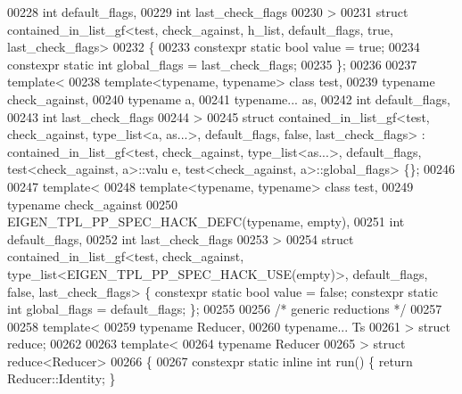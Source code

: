 \begin{DoxyCode}
00228   \textcolor{keywordtype}{int} default\_flags,
00229   \textcolor{keywordtype}{int} last\_check\_flags
00230 >
00231 \textcolor{keyword}{struct }contained\_in\_list\_gf<test, check\_against, h\_list, default\_flags, true, last\_check\_flags>
00232 \{
00233   constexpr \textcolor{keyword}{static} \textcolor{keywordtype}{bool} value = \textcolor{keyword}{true};
00234   constexpr \textcolor{keyword}{static} \textcolor{keywordtype}{int} global\_flags = last\_check\_flags;
00235 \};
00236 
00237 \textcolor{keyword}{template}<
00238   \textcolor{keyword}{template}<\textcolor{keyword}{typename}, \textcolor{keyword}{typename}> \textcolor{keyword}{class }test,
00239   \textcolor{keyword}{typename} check\_against,
00240   \textcolor{keyword}{typename} a,
00241   \textcolor{keyword}{typename}... as,
00242   \textcolor{keywordtype}{int} default\_flags,
00243   \textcolor{keywordtype}{int} last\_check\_flags
00244 >
00245 \textcolor{keyword}{struct }contained\_in\_list\_gf<test, check\_against, type\_list<a, as...>, default\_flags, false, 
      last\_check\_flags> : contained\_in\_list\_gf<test, check\_against, type\_list<as...>, default\_flags, test<check\_against, a>::valu
      e, test<check\_against, a>::global\_flags> \{\};
00246 
00247 \textcolor{keyword}{template}<
00248   \textcolor{keyword}{template}<\textcolor{keyword}{typename}, \textcolor{keyword}{typename}> \textcolor{keyword}{class }test,
00249   \textcolor{keyword}{typename} check\_against
00250   EIGEN\_TPL\_PP\_SPEC\_HACK\_DEFC(\textcolor{keyword}{typename}, empty),
00251   \textcolor{keywordtype}{int} default\_flags,
00252   \textcolor{keywordtype}{int} last\_check\_flags
00253 >
00254 \textcolor{keyword}{struct }contained\_in\_list\_gf<test, check\_against, type\_list<EIGEN\_TPL\_PP\_SPEC\_HACK\_USE(empty)>, 
      default\_flags, false, last\_check\_flags> \{ constexpr \textcolor{keyword}{static} \textcolor{keywordtype}{bool} value = \textcolor{keyword}{false}; constexpr \textcolor{keyword}{static} \textcolor{keywordtype}{int} global\_flags = 
      default\_flags; \};
00255 
00256 \textcolor{comment}{/* generic reductions */}
00257 
00258 \textcolor{keyword}{template}<
00259   \textcolor{keyword}{typename} Reducer,
00260   \textcolor{keyword}{typename}... Ts
00261 > \textcolor{keyword}{struct }reduce;
00262 
00263 \textcolor{keyword}{template}<
00264   \textcolor{keyword}{typename} Reducer
00265 > \textcolor{keyword}{struct }reduce<Reducer>
00266 \{
00267   constexpr \textcolor{keyword}{static} \textcolor{keyword}{inline} \textcolor{keywordtype}{int} run() \{ \textcolor{keywordflow}{return} Reducer::Identity; \}

\end{DoxyCode}
